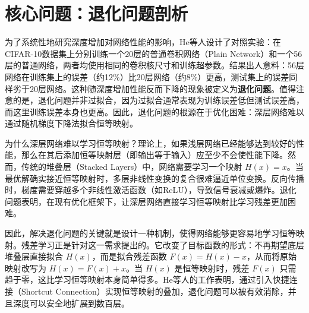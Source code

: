 \section{核心问题：退化问题剖析}

为了系统性地研究深度增加对网络性能的影响，He等人设计了对照实验：在CIFAR-10数据集上分别训练一个20层的普通卷积网络（Plain Network）和一个56层的普通网络，两者均使用相同的卷积核尺寸和训练超参数。结果出人意料：56层网络在训练集上的误差（约12\%）比20层网络（约8\%）更高，测试集上的误差同样劣于20层网络。这种随深度增加性能反而下降的现象被定义为\textbf{退化问题}。值得注意的是，退化问题并非过拟合，因为过拟合通常表现为训练误差低但测试误差高，而这里训练误差本身也更高。因此，退化问题的根源在于优化困难：深层网络难以通过随机梯度下降法拟合恒等映射。

为什么深层网络难以学习恒等映射？理论上，如果浅层网络已经能够达到较好的性能，那么在其后添加恒等映射层（即输出等于输入）应至少不会使性能下降。然而，传统的堆叠层（Stacked Layers）中，网络需要学习一个映射 $H(x) = x$。当最优解确实接近恒等映射时，多层非线性变换的复合很难逼近单位变换。反向传播时，梯度需要穿越多个非线性激活函数（如ReLU），导致信号衰减或爆炸。退化问题表明，在现有优化框架下，让深层网络直接学习恒等映射比学习残差更加困难。

因此，解决退化问题的关键就是设计一种机制，使得网络能够更容易地学习恒等映射。残差学习正是针对这一需求提出的。它改变了目标函数的形式：不再期望底层堆叠层直接拟合 $H(x)$，而是拟合残差函数 $F(x) = H(x) - x$，从而将原始映射改写为 $H(x) = F(x) + x$。当 $H(x)$ 是恒等映射时，残差 $F(x)$ 只需趋于零，这比学习恒等映射本身简单得多。He等人的工作表明，通过引入快捷连接（Shortcut Connection）实现恒等映射的叠加，退化问题可以被有效消除，并且深度可以安全地扩展到数百层。